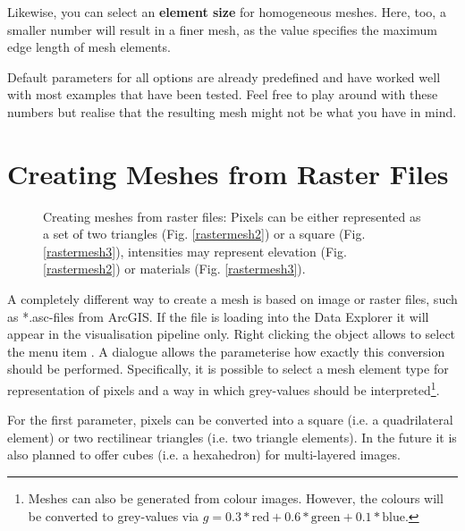 Likewise, you can select an \textbf{element size} for homogeneous meshes. Here, too, a smaller number will result in a finer mesh, as the value specifies the maximum edge length of mesh elements.

\bigskip

Default parameters for all options are already predefined and have worked well with most examples that have been tested. Feel free to play around with these numbers but realise that the resulting mesh might not be what you have in mind.

\section{Creating Meshes from Raster Files}
\label{meshraster}

\begin{figure}[tb]
\begin{center}
\enspace
{}\enspace
{}
\end{center}
\caption{Creating meshes from raster files: Pixels can be either represented as a set of two triangles (Fig. \ref{rastermesh2}) or a square (Fig. \ref{rastermesh3}), intensities may represent elevation (Fig. \ref{rastermesh2}) or materials (Fig. \ref{rastermesh3}).}
\label{fig:rastermesh}
\end{figure}

A completely different way to create a mesh is based on image or raster files, such as *.asc-files from ArcGIS. If the file is loading into the Data Explorer it will appear in the visualisation pipeline only. Right clicking the object allows to select the menu item . A dialogue allows the parameterise how exactly this conversion should be performed. Specifically, it is possible to select a mesh element type for representation of pixels and a way in which grey-values should be interpreted\footnote{Meshes can also be generated from colour images. However, the colours will be converted to grey-values via $g = 0.3*\text{red}+0.6*\text{green}+0.1*\text{blue}$.}.

For the first parameter, pixels can be converted into a square (i.e. a quadrilateral element) or two rectilinear triangles (i.e. two triangle elements). In the future it is also planned to offer cubes (i.e. a hexahedron) for multi-layered images.

